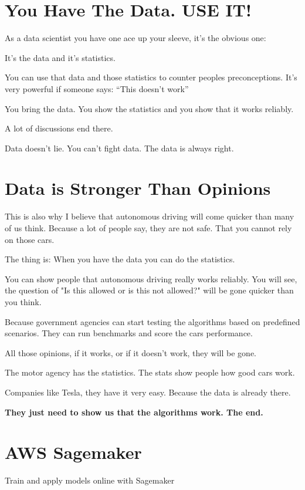 \documentclass[12pt, numbers=noenddot]{scrreprt} %
\begin{document}
\section{You Have The Data. USE IT!}

As a data scientist you have one ace up your sleeve, it’s the obvious one:

It’s the data and it’s statistics.

You can use that data and those statistics to counter peoples preconceptions. It’s very powerful if someone says: “This doesn’t work”

You bring the data. You show the statistics and you show that it works reliably.

A lot of discussions end there.

Data doesn’t lie. You can’t fight data.
The data is always right.

\section{Data is Stronger Than Opinions}

This is also why I believe that autonomous driving will come quicker than many of us think. Because a lot of people say, they are not safe. That you cannot rely on those cars.

The thing is: When you have the data you can do the statistics.

You can show people that autonomous driving really works reliably. You will see, the question of "Is this allowed or is this not allowed?" will be gone quicker than you think.

Because government agencies can start testing the algorithms based on predefined scenarios. They can run benchmarks and score the cars performance.

All those opinions, if it works, or if it doesn’t work, they will be gone.

The motor agency has the statistics. The stats show people how good cars work.

Companies like Tesla, they have it very easy. Because the data is already there.

\textbf{They just need to show us that the algorithms work. The end.}

\section{AWS Sagemaker}

Train and apply models online with Sagemaker
\end{document}
